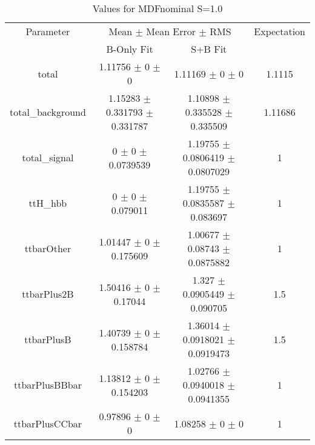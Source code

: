 \begin{table}
\centering
\caption{Values for MDFnominal S=1.0}
\begin{tabular}{cccc}
\toprule
Parameter & \multicolumn{2}{c}{Mean $\pm$ Mean Error $\pm$ RMS} & Expectation\\
 & B-Only Fit & S+B Fit & \\
\midrule
total & \num{1.11756} $\pm$ \num{0} $\pm$ \num{0} & \num{1.11169} $\pm$ \num{0} $\pm$ \num{0} & \num{1.1115}\\
total\_background & \num{1.15283} $\pm$ \num{0.331793} $\pm$ \num{0.331787} & \num{1.10898} $\pm$ \num{0.335528} $\pm$ \num{0.335509} & \num{1.11686}\\
total\_signal & \num{0} $\pm$ \num{0} $\pm$ \num{0.0739539} & \num{1.19755} $\pm$ \num{0.0806419} $\pm$ \num{0.0807029} & \num{1}\\
ttH\_hbb & \num{0} $\pm$ \num{0} $\pm$ \num{0.079011} & \num{1.19755} $\pm$ \num{0.0835587} $\pm$ \num{0.083697} & \num{1}\\
ttbarOther & \num{1.01447} $\pm$ \num{0} $\pm$ \num{0.175609} & \num{1.00677} $\pm$ \num{0.08743} $\pm$ \num{0.0875882} & \num{1}\\
ttbarPlus2B & \num{1.50416} $\pm$ \num{0} $\pm$ \num{0.17044} & \num{1.327} $\pm$ \num{0.0905449} $\pm$ \num{0.090705} & \num{1.5}\\
ttbarPlusB & \num{1.40739} $\pm$ \num{0} $\pm$ \num{0.158784} & \num{1.36014} $\pm$ \num{0.0918021} $\pm$ \num{0.0919473} & \num{1.5}\\
ttbarPlusBBbar & \num{1.13812} $\pm$ \num{0} $\pm$ \num{0.154203} & \num{1.02766} $\pm$ \num{0.0940018} $\pm$ \num{0.0941355} & \num{1}\\
ttbarPlusCCbar & \num{0.97896} $\pm$ \num{0} $\pm$ \num{0} & \num{1.08258} $\pm$ \num{0} $\pm$ \num{0} & \num{1}\\
\bottomrule
\end{tabular}
\end{table}